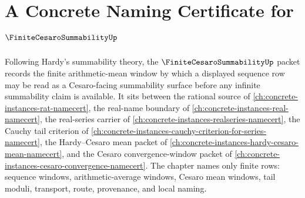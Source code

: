 \chapter{A Concrete Naming Certificate for $\FiniteCesaroSummabilityUp$}
\label{ch:concrete-instances-finite-cesaro-summability-namecert}

Following Hardy's summability theory, the $\FiniteCesaroSummabilityUp$ packet records the finite arithmetic-mean window by which a displayed sequence row may be read as a Cesaro-facing summability surface before any infinite summability claim is available. It sits between the rational source of \autoref{ch:concrete-instances-rat-namecert}, the real-name boundary of \autoref{ch:concrete-instances-real-namecert}, the real-series carrier of \autoref{ch:concrete-instances-realseries-namecert}, the Cauchy tail criterion of \autoref{ch:concrete-instances-cauchy-criterion-for-series-namecert}, the Hardy--Cesaro mean packet of \autoref{ch:concrete-instances-hardy-cesaro-mean-namecert}, and the Cesaro convergence-window packet of \autoref{ch:concrete-instances-cesaro-convergence-namecert}. The chapter names only finite rows: sequence windows, arithmetic-average windows, Cesaro mean windows, tail moduli, transport, route, provenance, and local naming.

